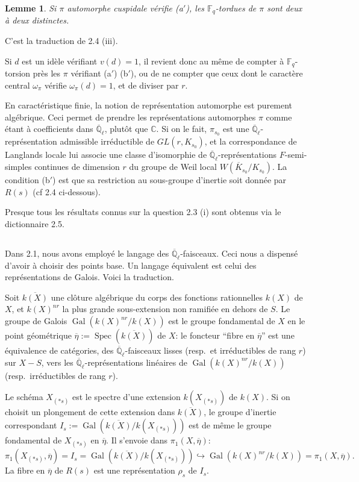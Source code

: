\documentclass[11pt,a4paper]{article}
\theoremstyle{plain}
\newtheorem{lemme}[theorem]{Lemme}
\theoremstyle{definition}
\DeclareMathOperator{\Spec}{Spec}
\DeclareMathOperator{\Gal}{Gal}
\newcommand{\F}{\mathbb{F}}
\newcommand{\C}{\mathbb{C}}
\newcommand{\Ql}{\overline{\mathbb{Q}}_\ell}
\begin{document}
\begin{lemme}
Si $\pi$ automorphe cuspidale v\'erifie (a$'$), les $\F_q$-tordues de $\pi$ sont deux \`a deux distinctes.
\end{lemme}
C'est la traduction de 2.4 (iii).

Si $d$ est un id\`ele v\'erifiant $v(d) = 1$, il revient donc au m\^eme de compter \`a $\F_q$-torsion pr\`es les $\pi$ v\'erifiant (a$'$) (b$'$), ou de ne compter que ceux dont le caract\`ere central $\omega_\pi$ v\'erifie $\omega_\pi(d) = 1$, et de diviser par $r$.

En caract\'eristique finie, la notion de repr\'esentation automorphe est purement alg\'ebrique. Ceci permet de prendre les repr\'esentations automorphes $\pi$ comme \'etant \`a coefficients dans $\Ql$, plut\^ot que $\C$. Si on le fait, $\pi_{s_0}$ est une $\Ql$-repr\'esentation admissible irr\'eductible de $GL(r, K_{s_0})$, et la correspondance de Langlands locale lui associe une classe d'isomorphie de $\Ql$-repr\'esentations $F$-semi-simples continues de dimension $r$ du groupe de Weil local $W(\overline{K}_{s_0}/K_{s_0})$. La condition (b$'$) est que sa restriction au sous-groupe d'inertie soit donn\'ee par $R(s)$ (cf 2.4 ci-dessous).

Presque tous les r\'esultats connus sur la question 2.3 (i) sont obtenus via le dictionnaire 2.5.

\subsection{}
Dans 2.1, nous avons employ\'e le langage des $\Ql$-faisceaux. Ceci nous a dispens\'e d'avoir \`a choisir des points base. Un langage \'equivalent est celui des repr\'esentations de Galois. Voici la traduction.

Soit $\overline{k(X)}$ une cl\^oture alg\'ebrique du corps des fonctions rationnelles $k(X)$ de $X$, et $k(X)^{nr}$ la plus grande sous-extension non ramifi\'ee en dehors de $S$. Le groupe de Galois $\Gal(k(X)^{nr}/k(X))$ est le groupe fondamental de $X$ en le point g\'eom\'etrique $\overline{\eta} := \Spec(\overline{k(X)})$ de $X$: le foncteur ``fibre en $\overline{\eta}$'' est une \'equivalence de cat\'egories, des $\Ql$-faisceaux lisses (resp.\ et irr\'eductibles de rang $r$) sur $X - S$, vers les $\Ql$-repr\'esentations lin\'eaires de $\Gal(k(X)^{nr}/k(X))$ (resp.\ irr\'eductibles de rang $r$).

Le sch\'ema $X_{(*s)}$ est le spectre d'une extension $k(X_{(*s)})$ de $k(X)$. Si on choisit un plongement de cette extension dans $\overline{k(X)}$, le groupe d'inertie correspondant $I_s := \Gal(\overline{k(X)}/k(X_{(*s)}))$ est de m\^eme le groupe fondamental de $X_{(*s)}$ en $\overline{\eta}$. Il s'envoie dans $\pi_1(X, \overline{\eta})$:
\begin{equation}
\pi_1(X_{(*s)}, \overline{\eta}) = I_s = \Gal(\overline{k(X)}/k(X_{(*s)})) \hookrightarrow \Gal(k(X)^{nr}/k(X)) = \pi_1(X, \overline{\eta}).
\tag{2.7.1}
\end{equation}
La fibre en $\overline{\eta}$ de $R(s)$ est une repr\'esentation $\rho_s$ de $I_s$.
\end{document}
